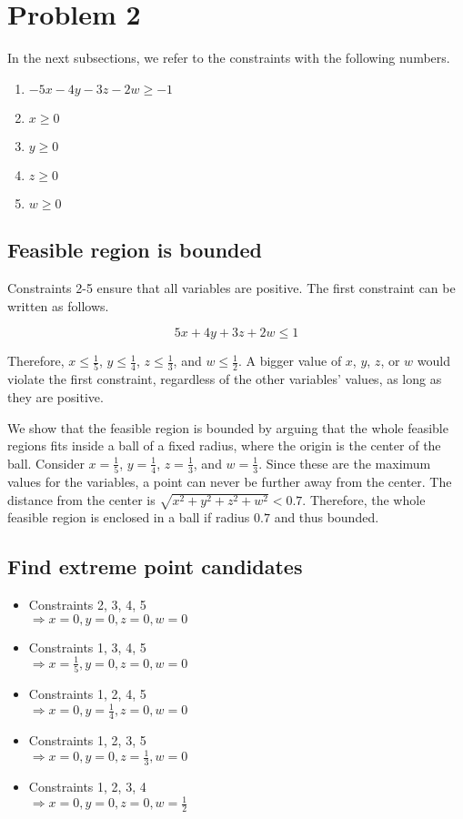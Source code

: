 \documentclass[12pt]{article}
\begin{document}
\section*{Problem 2}

In the next subsections, we refer to the constraints with the following numbers.

\begin{enumerate}
	\item $-5x - 4y - 3z -2w \geq -1$
	\item $x \geq 0$
	\item $y \geq 0$
	\item $z \geq 0$
	\item $w \geq 0$
\end{enumerate}

\subsection*{Feasible region is bounded}
Constraints 2-5 ensure that all variables are positive. The first constraint can be written as follows.

$$ 5x+4y+3z+2w \leq 1 $$

Therefore, $x \leq \frac{1}{5}$, $y \leq \frac{1}{4}$, $z \leq \frac{1}{3}$, and $w \leq \frac{1}{2}$. A bigger value of $x$, $y$, $z$, or $w$ would violate the first constraint, regardless of the other variables' values, as long as they are positive.

We show that the feasible region is bounded by arguing that the whole feasible regions fits inside a ball of a fixed radius, where the origin is the center of the ball. Consider $x=\frac{1}{5}$, $y=\frac{1}{4}$, $z=\frac{1}{3}$, and $w=\frac{1}{3}$. Since these are the maximum values for the variables, a point can never be further away from the center. The distance from the center is $\sqrt{x^2 + y^2 + z^2 + w^2} < 0.7$. Therefore, the whole feasible region is enclosed in a ball if radius $0.7$ and thus bounded.

\subsection*{Find extreme point candidates}
\begin{itemize}
	\item Constraints 2, 3, 4, 5 \\ $\Rightarrow x=0, y=0, z=0, w=0$
	\item Constraints 1, 3, 4, 5 \\ $\Rightarrow x=\frac{1}{5}, y=0, z=0, w=0$
	\item Constraints 1, 2, 4, 5 \\ $\Rightarrow x=0, y=\frac{1}{4}, z=0, w=0$
	\item Constraints 1, 2, 3, 5 \\ $\Rightarrow x=0, y=0, z=\frac{1}{3}, w=0$
	\item Constraints 1, 2, 3, 4 \\ $\Rightarrow x=0, y=0, z=0, w=\frac{1}{2}$
\end{itemize}
\end{document}

